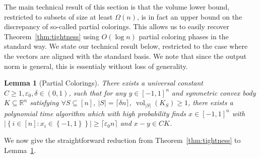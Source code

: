 \documentclass[12pt]{article}
\newtheorem{lemma}{Lemma}
\newcommand{\ceil}[1]{\lceil #1 \rceil}
\newcommand{\R}{{\mathbb{R}}}
\newcommand\eps{\varepsilon}
\newcommand{\set}[1]{\left\{ #1 \right\}}
\DeclareMathOperator{\vol}{vol}
\begin{document}
The main technical result of this section is that the volume lower bound,
restricted to subsets of size at least $\Omega(n)$, is in fact an upper bound on
the discrepancy of so-called partial colorings. This allows us to easily recover
Theorem~\ref{thm:tightness} using $O(\log n)$ partial coloring phases in the
standard way. We state our technical result below, restricted to the case where
the vectors are aligned with the standard basis. We note that since the output
norm is general, this is essentialy without loss of generality. 

\begin{lemma}[Partial Colorings] \label{lem:partial-via-volume}
There exists a universal constant $C \geq 1, \eps_0, \delta \in (0,1)$, such that
for any $y \in [-1,1]^n$ and symmetric convex body $K \subseteq \R^n$ satisfying
$\forall S \subseteq [n]$, $|S| = \ceil{\delta n}$, $\vol_{|S|}(K_S) \geq 1$, there
exists a polynomial time algorithm which with high probability finds $x \in
[-1,1]^n$ with $|\set{i \in [n]: x_i \in \set{-1,1}}| \geq \ceil{\eps_0 n}$ and
$x-y \in C K$.  
\end{lemma}

We now give the straightforward reduction from Theorem~\ref{thm:tightness} to
Lemma~\ref{lem:partial-via-volume}.
\end{document}
